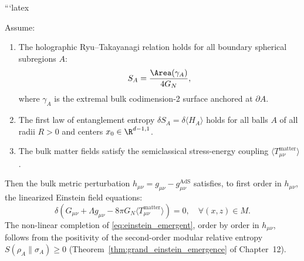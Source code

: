 ```latex
\begin{theorem}
\label{thm:einstein_emergence}
Assume:
\begin{enumerate}[label=(\alph*)]
    \item The holographic Ryu--Takayanagi relation holds for all boundary spherical subregions $A$:
    \begin{equation}
        S_A = \frac{\Area(\gamma_A)}{4 G_N},
    \end{equation}
    where $\gamma_A$ is the extremal bulk codimension-2 surface anchored at $\partial A$.
    \item The first law of entanglement entropy $\delta S_A = \delta \langle H_A \rangle$ holds for all balls $A$ of all radii $R > 0$ and centers $x_0 \in \R^{d-1, 1}$.
    \item The bulk matter fields satisfy the semiclassical stress-energy coupling $\langle T_{\mu\nu}^{\mathrm{matter}} \rangle$.
\end{enumerate}
Then the bulk metric perturbation $h_{\mu\nu} = g_{\mu\nu} - g_{\mu\nu}^{\mathrm{AdS}}$ satisfies, to first order in $h_{\mu\nu}$, the linearized Einstein field equations:
\begin{equation}
    \label{eq:einstein_emergent}
    \delta\!\left(G_{\mu\nu} + \Lambda g_{\mu\nu} - 8\pi G_N \langle T_{\mu\nu}^{\mathrm{matter}} \rangle\right) = 0, \quad \forall (x, z) \in M.
\end{equation}
The non-linear completion of \eqref{eq:einstein_emergent}, order by order in $h_{\mu\nu}$, follows from the positivity of the second-order modular relative entropy $S(\rho_A\|\sigma_A) \ge 0$ (Theorem~\ref{thm:grand_einstein_emergence} of Chapter~12).
\end{theorem}

